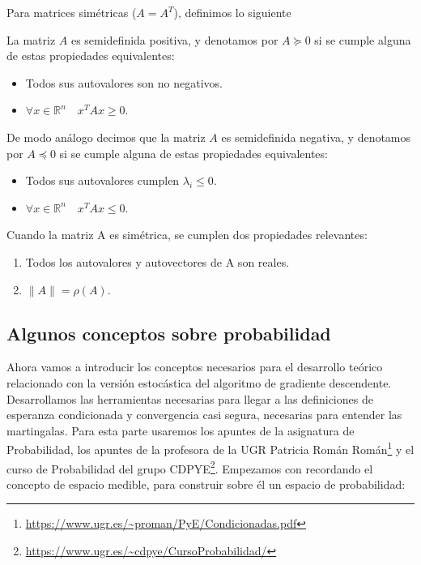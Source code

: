 Para matrices simétricas ($A=A^T$), definimos lo siguiente


\begin{definicion}
	La matriz $A$ es semidefinida positiva, y denotamos por $A \succeq 0$ si se cumple alguna de estas propiedades equivalentes: 

	\begin{itemize}
		\item Todos sus autovalores son no negativos.

		\item $\forall x \in \mathbb{R}^n \quad x^T A x \geq 0$.
	\end{itemize}

	De modo análogo decimos que la matriz $A$ es semidefinida negativa, y denotamos por $A \preceq 0$ si se cumple alguna de estas propiedades equivalentes: 

	\begin{itemize}
		\item Todos sus autovalores cumplen $ \lambda _i \leq 0$.

		\item $\forall x \in \mathbb{R}^n \quad x^T A x \leq 0$.
	\end{itemize}
\end{definicion}



Cuando la matriz A es simétrica, se cumplen dos propiedades relevantes:

\begin{enumerate}
\item Todos los autovalores y autovectores de A son reales.

\item $\| A \| = \rho(A)$.


\end{enumerate}

\subsection{Algunos conceptos sobre probabilidad}

Ahora vamos a introducir los conceptos necesarios para el desarrollo teórico relacionado con la versión estocástica del algoritmo de gradiente descendente. Desarrollamos las herramientas necesarias para llegar a las definiciones de esperanza condicionada y convergencia casi segura, necesarias para entender las martingalas. Para esta parte usaremos los apuntes de la asignatura de Probabilidad, los apuntes de la profesora de la UGR Patricia Román Román\footnote{\url{https://www.ugr.es/~proman/PyE/Condicionadas.pdf}} y el curso de Probabilidad del grupo CDPYE\footnote{\url{https://www.ugr.es/~cdpye/CursoProbabilidad/}}. Empezamos con recordando el concepto de espacio medible, para construir sobre él un espacio de probabilidad:

